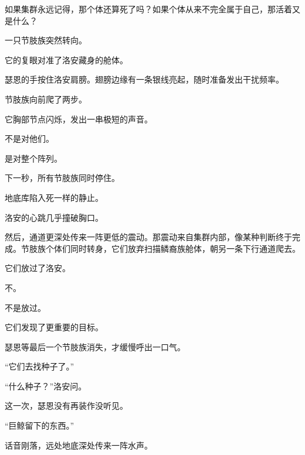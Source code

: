 如果集群永远记得，那个体还算死了吗？如果个体从来不完全属于自己，那活着又是什么？

一只节肢族突然转向。

它的复眼对准了洛安藏身的舱体。

瑟恩的手按住洛安肩膀。翅膀边缘有一条银线亮起，随时准备发出干扰频率。

节肢族向前爬了两步。

它胸部节点闪烁，发出一串极短的声音。

不是对他们。

是对整个阵列。

下一秒，所有节肢族同时停住。

地底库陷入死一样的静止。

洛安的心跳几乎撞破胸口。

然后，通道更深处传来一阵更低的震动。那震动来自集群内部，像某种判断终于完成。节肢族个体们同时转身，它们放弃扫描鳞裔族舱体，朝另一条下行通道爬去。

它们放过了洛安。

不。

不是放过。

它们发现了更重要的目标。

瑟恩等最后一个节肢族消失，才缓慢呼出一口气。

“它们去找种子了。”

“什么种子？”洛安问。

这一次，瑟恩没有再装作没听见。

“巨鲸留下的东西。”

话音刚落，远处地底深处传来一阵水声。
